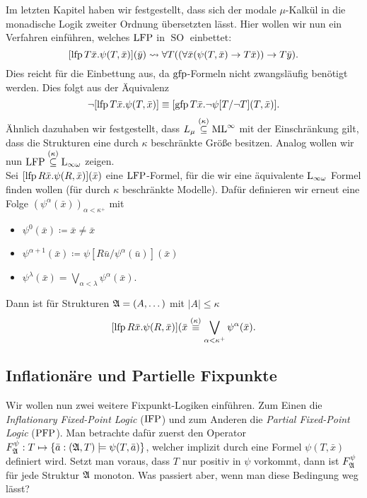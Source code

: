 Im letzten Kapitel haben wir festgestellt, dass sich der modale $\mu$-Kalkül in die monadische Logik zweiter Ordnung übersetzten lässt. Hier wollen wir nun ein Verfahren einführen, welches $\operatorname{LFP}$ in $\operatorname{SO}$ einbettet:
\[[\operatorname{lfp} T\bar{x} . \psi(T, \bar{x})](\bar{y})
\leadsto
\forall T ((\forall \bar{x}(\psi(T,\bar{x}) \rightarrow T\bar{x})) \rightarrow T\bar{y}).\]
Dies reicht für die Einbettung aus, da $\operatorname{gfp}$-Formeln nicht zwangsläufig benötigt werden. Dies folgt aus der Äquivalenz
\[\neg[\operatorname{lfp} T\bar{x}.\psi(T,\bar{x})] \equiv [\operatorname{gfp} T\bar{x}.\neg\psi[T/\neg T](T,\bar{x})].\]
Ähnlich dazuhaben wir festgestellt, dass $L_\mu \overset{(\kappa)}{\subseteq} \operatorname{ML}^\infty$ mit der Einschränkung gilt, dass die Strukturen eine durch $\kappa$ beschränkte Größe besitzen. Analog wollen wir nun $\operatorname{LFP} \stackrel{(\kappa)}{\subseteq} \operatorname{L}_{\infty\omega}$ zeigen.
\\
Sei $[\operatorname{lfp} R\bar{x} . \psi(R,\bar{x})](\bar{x})$ eine $\operatorname{LFP}$-Formel, für die wir eine äquivalente $\operatorname{L}_{\infty\omega}$ Formel finden wollen (für durch $\kappa$ beschränkte Modelle).
Dafür definieren wir erneut eine Folge $(\psi^\alpha(\bar{x}))_{\alpha <\kappa^+}$ mit
\begin{itemize}
	\item $\psi^0(\bar{x})\coloneqq\bar{x}\neq\bar{x}$
	\item $\psi^{\alpha+1}(\bar{x})\coloneqq \psi[R\bar{u} / \psi^\alpha(\bar{u})](\bar{x})$
	\item $\psi^\lambda(\bar{x})=\bigvee_{\alpha<\lambda}\psi^\alpha(\bar{x})$.
\end{itemize}
Dann ist für Strukturen $\mathfrak{A}=(A,\dots)$ mit $\vert A \vert \leq \kappa$
\[[\operatorname{lfp} R\bar{x}.\psi(R,\bar{x})](\bar{x} \overset{(\kappa)}{\equiv} \bigvee_{\alpha<\kappa^+}\psi^\alpha(\bar{x}).\]


\subsection{Inflationäre und Partielle Fixpunkte}

Wir wollen nun zwei weitere Fixpunkt-Logiken einführen. Zum Einen die \textit{Inflationary Fixed-Point Logic} ($\operatorname{IFP}$) und zum Anderen die \textit{Partial Fixed-Point Logic} ($\operatorname{PFP}$). 
Man betrachte dafür zuerst den Operator $F^\psi_{\mathfrak{A}} : T\mapsto\{\bar{a} : (\mathfrak{A},T) \models \psi(T,\bar{a})\}$, welcher implizit durch eine Formel $\psi(T,\bar{x})$ definiert wird. 
Setzt man voraus, dass $T$ nur positiv in $\psi$ vorkommt, dann ist $F^\psi_{\mathfrak{A}}$ für jede Struktur $\mathfrak{A}$ monoton. 
Was passiert aber, wenn man diese Bedingung weg lässt?

